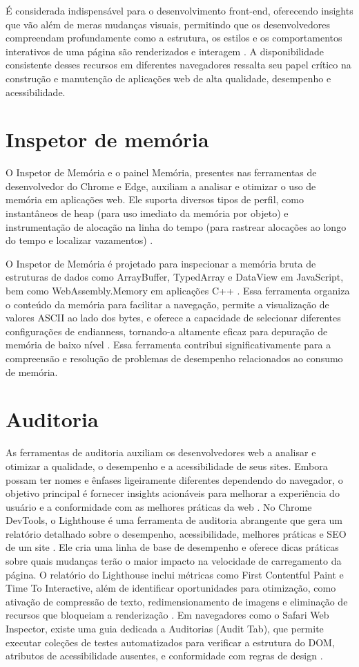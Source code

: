 É considerada indispensável para o desenvolvimento front-end, oferecendo insights que vão além de meras mudanças visuais, permitindo que os desenvolvedores compreendam profundamente como a estrutura, os estilos e os comportamentos interativos de uma página são renderizados e interagem \cite{chrome}. A disponibilidade consistente desses recursos em diferentes navegadores ressalta seu papel crítico na construção e manutenção de aplicações web de alta qualidade, desempenho e acessibilidade.
\section{Inspetor de memória}
O Inspetor de Memória e o painel Memória, presentes nas ferramentas de desenvolvedor do Chrome e Edge, auxiliam a analisar e otimizar o uso de memória em aplicações web. Ele suporta diversos tipos de perfil, como instantâneos de heap (para uso imediato da memória por objeto) e instrumentação de alocação na linha do tempo (para rastrear alocações ao longo do tempo e localizar vazamentos) \cite{edge}.

O Inspetor de Memória é projetado para inspecionar a memória bruta de estruturas de dados como ArrayBuffer, TypedArray e DataView em JavaScript, bem como WebAssembly.Memory em aplicações C++ \cite{chrome}. Essa ferramenta organiza o conteúdo da memória para facilitar a navegação, permite a visualização de valores ASCII ao lado dos bytes, e oferece a capacidade de selecionar diferentes configurações de endianness, tornando-a altamente eficaz para depuração de memória de baixo nível \cite{chrome}. Essa ferramenta contribui significativamente para a compreensão e resolução de problemas de desempenho relacionados ao consumo de memória.

\section{Auditoria}
As ferramentas de auditoria auxiliam os desenvolvedores web a analisar e otimizar a qualidade, o desempenho e a acessibilidade de seus sites. Embora possam ter nomes e ênfases ligeiramente diferentes dependendo do navegador, o objetivo principal é fornecer insights acionáveis para melhorar a experiência do usuário e a conformidade com as melhores práticas da web
.
No Chrome DevTools, o Lighthouse é uma ferramenta de auditoria abrangente que gera um relatório detalhado sobre o desempenho, acessibilidade, melhores práticas e SEO de um site \cite{chrome}. Ele cria uma linha de base de desempenho e oferece dicas práticas sobre quais mudanças terão o maior impacto na velocidade de carregamento da página. O relatório do Lighthouse inclui métricas como First Contentful Paint e Time To Interactive, além de identificar oportunidades para otimização, como ativação de compressão de texto, redimensionamento de imagens e eliminação de recursos que bloqueiam a renderização \cite{chrome}. Em navegadores como o Safari Web Inspector, existe uma guia dedicada a Auditorias (Audit Tab), que permite executar coleções de testes automatizados para verificar a estrutura do DOM, atributos de acessibilidade ausentes, e conformidade com regras de design \cite{apple}.


